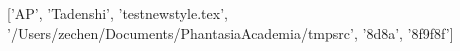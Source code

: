 ['AP', 'Tadenshi', 'testnewstyle.tex', '/Users/zechen/Documents/PhantasiaAcademia/tmpsrc', '\x8d\xbb{}\x8a\xbf{}\xaf{}\xbf', '\x8f\xbd{}\xaf{}\x9f\x8f']
